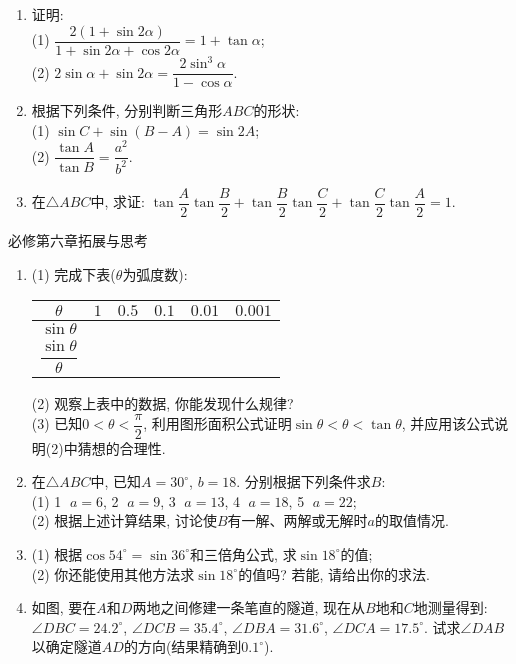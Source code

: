 \documentclass[10pt,a4paper]{article}
\begin{document}
\begin{enumerate}[1.]
\item 证明:\\
(1) $\dfrac{2(1+\sin 2\alpha)}{1+\sin 2\alpha+\cos 2\alpha}=1+\tan \alpha$;\\
(2) $2\sin \alpha+\sin 2\alpha=\dfrac{2\sin^3\alpha}{1-\cos \alpha}$.
\item 根据下列条件, 分别判断三角形$ABC$的形状:\\
(1) $\sin C+\sin (B-A)=\sin 2A$;\\
(2) $\dfrac{\tan A}{\tan B}=\dfrac{a^2}{b^2}$.
\item 在$\triangle ABC$中, 求证: $\tan \dfrac A2\tan \dfrac B2+\tan \dfrac B2\tan\dfrac C2+\tan\dfrac C2\tan\dfrac A2=1$.
\end{enumerate}

必修第六章拓展与思考
\begin{enumerate}[1.]
\item (1) 完成下表($\theta$为弧度数):
\begin{center}
\begin{tabular}{|c|p{}<{\centering}|p{}<{\centering}|p{}<{\centering}|p{}<{\centering}|p{}<{\centering}|}
    \hline
    $\theta$ & $1$ & $0.5$ & $0.1$ & $0.01$ & $0.001$\\ \hline
    $\sin\theta$ & & & & &\\ \hline
    $\dfrac{\sin\theta}{\theta}$ & & & & &\\ \hline
\end{tabular}
\end{center}
(2) 观察上表中的数据, 你能发现什么规律?\\
(3) 已知$0<\theta <\dfrac \pi 2$, 利用图形面积公式证明$\sin \theta <\theta <\tan \theta$, 并应用该公式说明(2)中猜想的合理性.
\item 在$\triangle ABC$中, 已知$A=30^\circ$, $b=18$. 分别根据下列条件求$B$:\\
(1) \textcircled{1} $a=6$, \textcircled{2} $a=9$, \textcircled{3} $a=13$, \textcircled{4} $a=18$, \textcircled{5} $a=22$;\\
(2) 根据上述计算结果, 讨论使$B$有一解、两解或无解时$a$的取值情况.
\item (1) 根据$\cos 54^\circ=\sin 36^\circ$和三倍角公式, 求$\sin 18^\circ$的值;\\
(2) 你还能使用其他方法求$\sin 18^\circ$的值吗? 若能, 请给出你的求法.
\item 如图, 要在$A$和$D$两地之间修建一条笔直的隧道, 现在从$B$地和$C$地测量得到: $\angle DBC=24.2^\circ$, $\angle DCB=35.4^\circ$, $\angle DBA=31.6^\circ$, $\angle DCA=17.5^\circ$. 试求$\angle DAB$以确定隧道$AD$的方向(结果精确到$0.1^\circ$).
\begin{center}
\end{center}



\end{enumerate}
\end{document}
